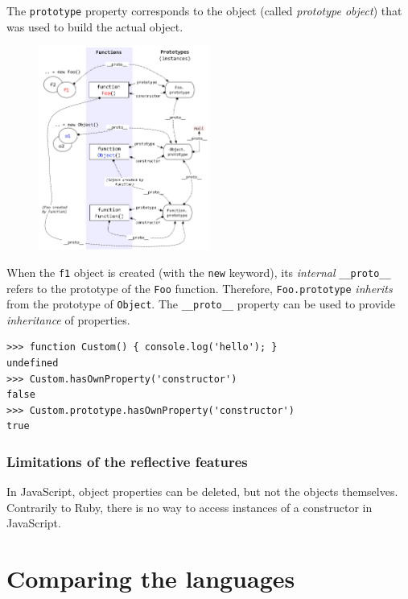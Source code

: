 \documentclass[a4paper,10pt]{article}
\begin{document}
The \lstinline|prototype| property corresponds to the object (called \textit{prototype object}) that was used to build the actual object.

\begin{figure}[h]
    \centering
    \includegraphics[width=0.5\textwidth]{jstypes.png}
\end{figure}

When the \lstinline|f1| object is created (with the \lstinline|new| keyword), its \textit{internal} \lstinline|__proto__| refers to the prototype of the \lstinline|Foo| function.
Therefore, \lstinline|Foo.prototype| \textit{inherits} from the prototype of \lstinline|Object|.
The \lstinline|__proto__| property can be used to provide \textit{inheritance} of properties.

\begin{lstlisting}
>>> function Custom() { console.log('hello'); }
undefined
>>> Custom.hasOwnProperty('constructor')
false
>>> Custom.prototype.hasOwnProperty('constructor')
true
\end{lstlisting}


\subsubsection{Limitations of the reflective features}

In JavaScript, object properties can be deleted, but not the objects themselves.
Contrarily to Ruby, there is no way to access instances of a constructor in JavaScript.




\newpage
\section{Comparing the languages}
\end{document}
